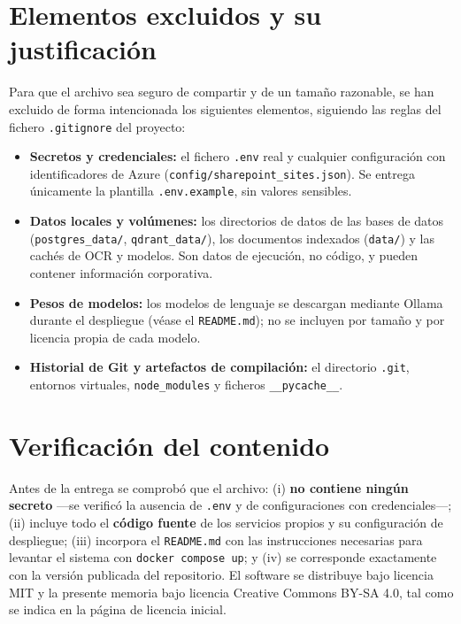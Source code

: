 \section{Elementos excluidos y su justificación}

Para que el archivo sea seguro de compartir y de un tamaño razonable, se han excluido de forma intencionada los siguientes elementos, siguiendo las reglas del fichero \texttt{.gitignore} del proyecto:

\begin{itemize}
    \item \textbf{Secretos y credenciales:} el fichero \texttt{.env} real y cualquier configuración con identificadores de Azure (\texttt{config/sharepoint\_sites.json}). Se entrega únicamente la plantilla \texttt{.env.example}, sin valores sensibles.
    \item \textbf{Datos locales y volúmenes:} los directorios de datos de las bases de datos (\texttt{postgres\_data/}, \texttt{qdrant\_data/}), los documentos indexados (\texttt{data/}) y las cachés de OCR y modelos. Son datos de ejecución, no código, y pueden contener información corporativa.
    \item \textbf{Pesos de modelos:} los modelos de lenguaje se descargan mediante Ollama durante el despliegue (véase el \texttt{README.md}); no se incluyen por tamaño y por licencia propia de cada modelo.
    \item \textbf{Historial de Git y artefactos de compilación:} el directorio \texttt{.git}, entornos virtuales, \texttt{node\_modules} y ficheros \texttt{\_\_pycache\_\_}.
\end{itemize}

\section{Verificación del contenido}

Antes de la entrega se comprobó que el archivo: (i) \textbf{no contiene ningún secreto} ---se verificó la ausencia de \texttt{.env} y de configuraciones con credenciales---; (ii) incluye todo el \textbf{código fuente} de los servicios propios y su configuración de despliegue; (iii) incorpora el \texttt{README.md} con las instrucciones necesarias para levantar el sistema con \texttt{docker compose up}; y (iv) se corresponde exactamente con la versión publicada del repositorio. El software se distribuye bajo licencia MIT y la presente memoria bajo licencia Creative Commons BY-SA 4.0, tal como se indica en la página de licencia inicial.
